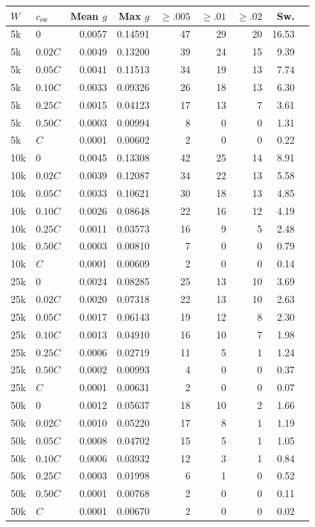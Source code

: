 \begin{tabular}{llrrrrrrr}
\toprule
$W$ & $c_{\text{sw}}$ & Mean $g$ & Max $g$ & $\ge .005$ & $\ge .01$ & $\ge .02$ & Sw. \\
\midrule
5k & $0$ & 0.0057 & 0.14591 & 47 & 29 & 20 & 16.53 \\
5k & $0.02C$ & 0.0049 & 0.13200 & 39 & 24 & 15 & 9.39 \\
5k & $0.05C$ & 0.0041 & 0.11513 & 34 & 19 & 13 & 7.74 \\
5k & $0.10C$ & 0.0033 & 0.09326 & 26 & 18 & 13 & 6.30 \\
5k & $0.25C$ & 0.0015 & 0.04123 & 17 & 13 & 7 & 3.61 \\
5k & $0.50C$ & 0.0003 & 0.00994 & 8 & 0 & 0 & 1.31 \\
5k & $C$ & 0.0001 & 0.00602 & 2 & 0 & 0 & 0.22 \\
\midrule
10k & $0$ & 0.0045 & 0.13308 & 42 & 25 & 14 & 8.91 \\
10k & $0.02C$ & 0.0039 & 0.12087 & 34 & 22 & 13 & 5.58 \\
10k & $0.05C$ & 0.0033 & 0.10621 & 30 & 18 & 13 & 4.85 \\
10k & $0.10C$ & 0.0026 & 0.08648 & 22 & 16 & 12 & 4.19 \\
10k & $0.25C$ & 0.0011 & 0.03573 & 16 & 9 & 5 & 2.48 \\
10k & $0.50C$ & 0.0003 & 0.00810 & 7 & 0 & 0 & 0.79 \\
10k & $C$ & 0.0001 & 0.00609 & 2 & 0 & 0 & 0.14 \\
\midrule
25k & $0$ & 0.0024 & 0.08285 & 25 & 13 & 10 & 3.69 \\
25k & $0.02C$ & 0.0020 & 0.07318 & 22 & 13 & 10 & 2.63 \\
25k & $0.05C$ & 0.0017 & 0.06143 & 19 & 12 & 8 & 2.30 \\
25k & $0.10C$ & 0.0013 & 0.04910 & 16 & 10 & 7 & 1.98 \\
25k & $0.25C$ & 0.0006 & 0.02719 & 11 & 5 & 1 & 1.24 \\
25k & $0.50C$ & 0.0002 & 0.00993 & 4 & 0 & 0 & 0.37 \\
25k & $C$ & 0.0001 & 0.00631 & 2 & 0 & 0 & 0.07 \\
\midrule
50k & $0$ & 0.0012 & 0.05637 & 18 & 10 & 2 & 1.66 \\
50k & $0.02C$ & 0.0010 & 0.05220 & 17 & 8 & 1 & 1.19 \\
50k & $0.05C$ & 0.0008 & 0.04702 & 15 & 5 & 1 & 1.05 \\
50k & $0.10C$ & 0.0006 & 0.03932 & 12 & 3 & 1 & 0.84 \\
50k & $0.25C$ & 0.0003 & 0.01998 & 6 & 1 & 0 & 0.52 \\
50k & $0.50C$ & 0.0001 & 0.00768 & 2 & 0 & 0 & 0.11 \\
50k & $C$ & 0.0001 & 0.00670 & 2 & 0 & 0 & 0.02 \\
\bottomrule
\end{tabular}

